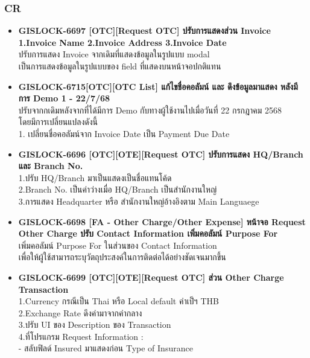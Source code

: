 \subsubsection{CR}
\begin{itemize}
    \setlength\itemsep{1em}
    \sloppy
    \item \textbf{{GISLOCK-6697 [OTC][Request OTC] ปรับการแสดงส่วน Invoice 1.Invoice Name 2.Invoice Address 3.Invoice Date}} \\
          ปรับการแสดง Invoice จากเดิมที่แสดงข้อมูลในรูปแบบ modal\\
            เป็นการแสดงข้อมูลในรูปแบบของ field ที่แสดงบนหน้าจอปกติแทน
    \item \textbf{{GISLOCK-6715[OTC][OTC List] แก้ไขชื่อคอลัมน์ และ ดึงข้อมูลมาแสดง หลังมีการ Demo 1 - 22/7/68}} \\
          ปรับจากกเดิมหลังจากที่ได้มีการ Demo กับทางผู้ใช้งานไปเมื่อวันที่ 22 กรกฎาคม 2568 \\
            โดยมีการเปลี่ยนแปลงดังนี้ \\
            1. เปลี่ยนชื่อคอลัมน์จาก Invoice Date เป็น Payment Due Date
    \item \textbf{{GISLOCK-6696 [OTC][OTE][Request OTC] ปรับการแสดง HQ/Branch และ Branch No.}} \\
          1.ปรับ HQ/Branch มาเป็นแสดงเป็นชื่อแทนโค้ด \\
          2.Branch No. เป็นค่าว่างเมื่อ HQ/Branch เป็นสำนักงานใหญ่ \\
          3.การแสดง Headquarter หรือ สำนักงานใหญ่อ้างอิงตาม Main Languaege
    \item \textbf{{GISLOCK-6698 [FA - Other Charge/Other Expense] หน้าจอ Request Other Charge ปรับ Contact Information เพิ่มคอลัมน์ Purpose For}} \\
          เพิ่มคอลัมน์ Purpose For ในส่วนของ Contact Information \\
            เพื่อให้ผู้ใช้สามารถระบุวัตถุประสงค์ในการติดต่อได้อย่างชัดเจนมากขึ้น 
    \item \textbf{{GISLOCK-6699 [OTC][OTE][Request OTC] ส่วน Other Charge Transaction}} \\
          1.Currency กรณีเป็น Thai หรือ Local default ค่าเป็ฯ THB \\
          2.Exchange Rate ดึงค่ามาจากค่ากลาง  \\
          3.ปรับ UI ของ Description ของ Transaction \\
          4.ที่โปรแกรม Request Information :\\
            - สลับฟิลด์ Insured มาแสดงก่อน Type of Insurance \\

\end{itemize}

